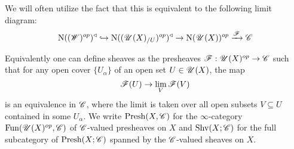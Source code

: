 \documentclass[../../thesis.tex]{subfiles}
\begin{document}
\begin{remark}
    We will often utilize the fact that this is equivalent to the following limit diagram:
    \[
        \mathrm{N}((\mathscr{W})^{op})^{\triangleleft} \hookrightarrow \mathrm{N}((\mathscr{U}(X)_{/U})^{op})^{\triangleleft} \rightarrow \mathrm{N}(\mathscr{U}(X))^{op}\xrightarrow{\mathscr{F}}\mathscr{C}
    \]
\end{remark}
Equivalently one can define sheaves as the presheaves $\mathscr{F} : \mathscr{U}(X)^{op} \to \mathscr{C}$ such that for any open cover $\{U_{\alpha}\}$ of an open set $U \in \mathscr{U}(X)$, the map
\[
    \mathscr{F}(U) \to \lim_V \mathscr{F}(V)
\]
is an equivalence in $\mathscr{C}$, where the limit is taken over all open subsets $V\subseteq U$ contained in some $U_{\alpha}$.
We write $\mathrm{Presh}(X, \mathscr{C})$ for the $\infty$-category $\mathrm{Fun}(\mathscr{U}(X)^{op}, \mathscr{C})$ of $\mathscr{C}$-valued presheaves on $X$ and $\mathrm{Shv}(X;\mathscr{C})$ for the full subcategory of $\mathrm{Presh}(X;\mathscr{C})$ spanned by the $\mathscr{C}$-valued sheaves on $X$.
\end{document}

